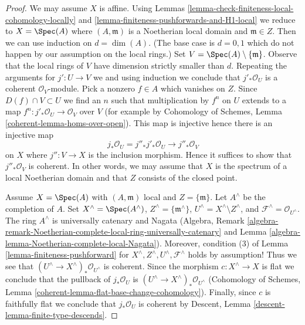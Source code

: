 \begin{proof}
We may assume $X$ is affine.
Using Lemmas \ref{lemma-check-finiteness-local-cohomology-locally} and
\ref{lemma-finiteness-pushforwards-and-H1-local} we reduce to
$X = \Spec(A)$ where $(A, \mathfrak m)$ is a Noetherian local domain
and $\mathfrak m \in Z$.
Then we can use induction on $d = \dim(A)$.
(The base case is $d = 0, 1$ which do not happen by
our assumption on the local rings.)
Set $V = \Spec(A) \setminus \{\mathfrak m\}$.
Observe that the local rings of $V$ have dimension strictly smaller than $d$.
Repeating the arguments for $j' : U \to V$ we
and using induction we conclude that $j'_*\mathcal{O}_U$ is
a coherent $\mathcal{O}_V$-module.
Pick a nonzero $f \in A$ which vanishes on $Z$.
Since $D(f) \cap V \subset U$ we find an $n$ such that
multiplication by $f^n$ on $U$ extends to a map
$f^n : j'_*\mathcal{O}_U \to \mathcal{O}_V$ over $V$
(for example by Cohomology of Schemes, Lemma
\ref{coherent-lemma-homs-over-open}). This map is injective
hence there is an injective map
$$
j_*\mathcal{O}_U = j''_* j'_* \mathcal{O}_U \to j''_*\mathcal{O}_V
$$
on $X$ where $j'' : V \to X$ is the inclusion morphism.
Hence it suffices to show that $j''_*\mathcal{O}_V$ is coherent.
In other words, we may assume that $X$ is the spectrum
of a local Noetherian domain and that $Z$
consists of the closed point.

\medskip\noindent
Assume $X = \Spec(A)$ with $(A, \mathfrak m)$ local and $Z = \{\mathfrak m\}$.
Let $A^\wedge$ be the completion of $A$.
Set $X^\wedge = \Spec(A^\wedge)$, $Z^\wedge = \{\mathfrak m^\wedge\}$,
$U^\wedge = X^\wedge \setminus Z^\wedge$, and
$\mathcal{F}^\wedge = \mathcal{O}_{U^\wedge}$.
The ring $A^\wedge$ is universally catenary and Nagata (Algebra, Remark
\ref{algebra-remark-Noetherian-complete-local-ring-universally-catenary} and
Lemma \ref{algebra-lemma-Noetherian-complete-local-Nagata}).
Moreover, condition (3) of Lemma \ref{lemma-finiteness-pushforward}
for $X^\wedge, Z^\wedge, U^\wedge, \mathcal{F}^\wedge$
holds by assumption! Thus we see that
$(U^\wedge \to X^\wedge)_*\mathcal{O}_{U^\wedge}$
is coherent. Since the morphism $c : X^\wedge \to X$
is flat we conclude that the pullback of $j_*\mathcal{O}_U$ is
$(U^\wedge \to X^\wedge)_*\mathcal{O}_{U^\wedge}$
(Cohomology of Schemes, Lemma
\ref{coherent-lemma-flat-base-change-cohomology}).
Finally, since $c$ is faithfully flat we conclude that
$j_*\mathcal{O}_U$ is coherent by
Descent, Lemma \ref{descent-lemma-finite-type-descends}.
\end{proof}

